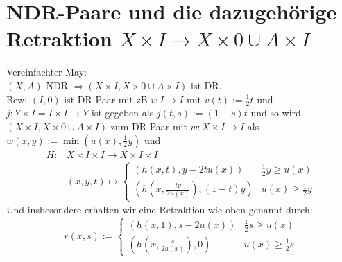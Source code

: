 \documentclass[11pt,twoside,a4paper]{scrbook} %
\begin{document}
\section{NDR-Paare und die dazugeh\"orige Retraktion $X\times I\rightarrow X\times 0 \cup A\times I $}
Vereinfachter May:\\
$(X,A)$ NDR $\Rightarrow (X\times I, X\times 0 \cup A\times I)$ ist DR.\\
Bew: $(I,0)$ ist DR Paar mit zB $v\colon I\rightarrow I$ mit $v(t):=\frac12t$ und $j\colon Y\times I = I\times I \rightarrow Y$ ist gegeben als $j(t,s):=(1-s)t$ und so wird
$(X\times I, X\times 0 \cup A\times I)$ zum DR-Paar mit $w\colon X\times I \rightarrow I$ als $w(x,y):=\min(u(x),\frac12y)$ und 
$$\begin{aligned}
H\colon &X\times I\times I\rightarrow X\times I\times I\\
&(x,y,t) \mapsto {\begin{cases}(h(x,t), y-2tu(x)) & \frac12y\geq u(x)\\ (h(x,\frac{ty}{2u(x)}), (1-t)y) &u(x)\geq \frac12y\end{cases}}\end{aligned}$$
Und insbesondere erhalten wir eine Retraktion wie oben genannt durch:\\
$$r(x,s) := \begin{cases}(h(x,1), s-2u(x)) & \frac12s\geq u(x) \\ (h(x,\frac{s}{2u(x)}),0) & u(x)\geq \frac12s\end{cases}$$
\end{document}
